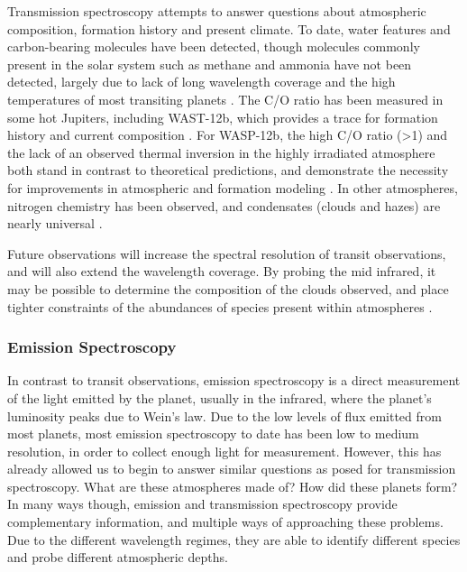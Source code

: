 Transmission spectroscopy attempts to answer questions about atmospheric composition, formation history and present climate.
To date, water features and carbon-bearing molecules have been detected, though molecules commonly present in the solar system such as methane and ammonia have not been detected, largely due to lack of long wavelength coverage and the high temperatures of most transiting planets \parencite{Lee2012,Kreidberg2018}.
The C/O ratio has been measured in some hot Jupiters, including WAST-12b, which provides a trace for formation history and current composition \parencite{Madhusudhan2011}. 
For WASP-12b, the high C/O ratio (>1) and the lack of an observed thermal inversion in the highly irradiated atmosphere both stand in contrast to theoretical predictions, and demonstrate the necessity for improvements in atmospheric and formation modeling \parencite{Madhusudhan2011}.
In other atmospheres, nitrogen chemistry has been observed, and condensates (clouds and hazes) are nearly universal \parencite{MacDonald2017}.

Future observations will increase the spectral resolution of transit observations, and will also extend the wavelength coverage. 
By probing the mid infrared, it may be possible to determine the composition of the clouds observed, and place tighter constraints of the abundances of species present within atmospheres \parencite{Kreidberg2018}.

\subsubsection{Emission Spectroscopy}
In contrast to transit observations, emission spectroscopy is a direct measurement of the light emitted by the planet, usually in the infrared, where the planet's luminosity peaks due to Wein's law.
Due to the low levels of flux emitted from most planets, most emission spectroscopy to date has been low to medium resolution, in order to collect enough light for measurement. 
However, this has already allowed us to begin to answer similar questions as posed for transmission spectroscopy.
What are these atmospheres made of? How did these planets form?
In many ways though, emission and transmission spectroscopy provide complementary information, and multiple ways of approaching these problems. 
Due to the different wavelength regimes, they are able to identify different species and probe different atmospheric depths. 

